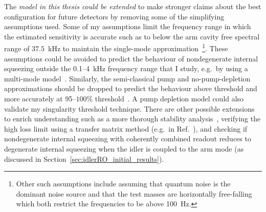 The \emph{model in this thesis could be extended} to make stronger claims about the best configuration for future detectors by removing some of the simplifying assumptions used.
Some of my assumptions limit the frequency range in which the estimated sensitivity is accurate such as to below the arm cavity free spectral range of $37.5$~kHz to maintain the single-mode approximation~\footnote{Other such assumptions include assuming that quantum noise is the dominant noise source and that the test masses are horizontally free-falling which both restrict the frequencies to be above 100~Hz.}. These assumptions could be avoided to predict the behaviour of nondegenerate internal squeezing outside the 0.1--4~kHz frequency range that I study, e.g.\ by using a multi-mode model~\cite{liEnhancingInterferometerSensitivity2021}.
Similarly, the semi-classical pump and no-pump-depletion approximations should be dropped to predict the behaviour above threshold and more accurately at 95--$100\%$ threshold~\cite{walls_1995}. A pump depletion model could also validate my singularity threshold technique. %
There are other possible extensions to enrich understanding such as a more thorough stability analysis~\cite{liEnhancingInterferometerSensitivity2021}, verifying the high loss limit using a transfer matrix method (e.g.\ in Ref.~\cite{korobkoQuantumExpanderGravitationalwave2019}), and checking if nondegenerate internal squeezing with coherently combined readout reduces to degenerate internal squeezing when the idler is coupled to the arm mode (as discussed in Section~\ref{sec:idlerRO_initial_results}).

